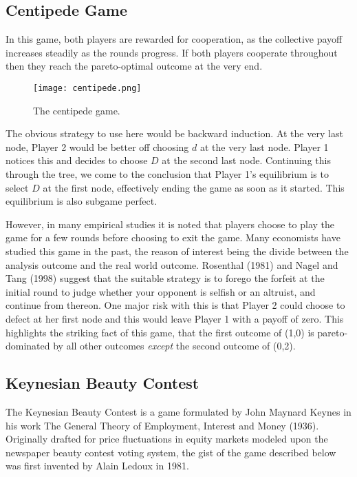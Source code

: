 \documentclass[11pt]{article}
\theoremstyle{definition}
\begin{document}
\subsection{Centipede Game}

In this game, both players are rewarded for cooperation, as the collective payoff increases steadily as the rounds progress. If both players cooperate throughout then they reach the pareto-optimal outcome at the very end. 

\begin{figure}[h!]
\centering
\texttt{[image: centipede.png]}
\caption{The centipede game.}
\label{fig:cent}
\end{figure}

The obvious strategy to use here would be backward induction. At the very last node, Player 2 would be better off choosing $d$ at the very last node. Player 1 notices this and decides to choose $D$ at the second last node. Continuing this through the tree, we come to the conclusion that Player 1's equilibrium is to select $D$ at the first node, effectively ending the game as soon as it started. This equilibrium is also subgame perfect.

However, in many empirical studies it is noted that players choose to play the game for a few rounds before choosing to exit the game. Many economists have studied this game in the past, the reason of interest being the divide between the analysis outcome and the real world outcome. Rosenthal (1981) and Nagel and Tang (1998) suggest that the suitable strategy is to forego the forfeit at the initial round to judge whether your opponent is selfish or an altruist, and continue from thereon. One major risk with this is that Player 2 could choose to defect at her first node and this would leave Player 1 with a payoff of zero. This highlights the striking fact of this game, that the first outcome of (1,0) is pareto-dominated by all other outcomes \textit{except} the second outcome of (0,2).

\subsection{Keynesian Beauty Contest}

The Keynesian Beauty Contest is a game formulated by John Maynard Keynes in his work The General Theory of Employment, Interest and Money (1936). Originally drafted for price fluctuations in equity markets modeled upon the newspaper beauty contest voting system, the gist of the game described below was first invented by Alain Ledoux in 1981.
\end{document}
